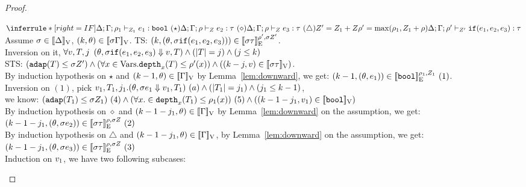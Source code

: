 \documentclass[a4paper,11pt]{article}
\theoremstyle{definition}
\begin{document}
\begin{proof}
\begin{mainitem}
\caseL
{
$
    \inferrule*[right = IF]{
      \Delta; \Gamma; \dmap_1 \tvdash{\nnatA_1} \expr_1: \tbool ~ (\star) \\
      \Delta; \Gamma; \dmap \tvdash{\nnatA} \expr_2: \type ~(\diamond) \\
      \Delta; \Gamma; \dmap \tvdash{\nnatA} \expr_3: \type ~(\triangle) \\\\
      \nnatA' = \nnatA_1 + \nnatA \\
      \dmap' = \max(\dmap_1, \nnatA_1 + \dmap)
    }{
      \Delta; \Gamma; \dmap' \tvdash{\nnatA'} \eif(\expr_1, \expr_2, \expr_3):  \type
    }
$
}
Assume $ \sigma \in [\![ \Delta ]\!]_{\text{V}}$, $(k, \theta) \in [\![ \sigma \Gamma ]\!]_{\text{V}}$. TS: $(k, (\theta, \sigma \mathtt{if}(e_1, e_2, e_3))) \in [\![ \sigma \tau ]\!]_{\text{E}}^{\rho', \sigma Z'}$.\\
%
Inversion on it, $\forall v, T, j$ $(\theta, \sigma  \mathtt{if}(e_1, e_2, e_3) \mathrel{\Downarrow} v, T) \land (|T| = j) \land (j \leq k)$\\
%
STS: $(\mathtt{adap}(T) \leq \sigma  Z') \land (\forall x \in \mbox{Vars}. \mathtt{depth}_{x}(T) \leq \rho'(x)) \land ((k - j, v) \in [\![ \sigma \tau ]\!]_{\text{V}})$.\\
%
By induction hypothesis on $\star$ and $(k-1, \theta) \in
[\![ \Gamma ]\!]_{\text{V}}$ by  Lemma~\ref{lem:downward}, we get: $(k-1, (\theta, e_1)) \in [\![ \mathtt{bool} ]\!]_{\text{E}}^{\rho_1, Z_1} ~(1)$.\\
%
Inversion on $(1)$, pick $ v_1, T_1, j_1. (\theta, \sigma e_1 \mathrel{\Downarrow} v_1, T_1) ~ (a) \land (|T_1| = j_1) \land (j_1 \leq k-1)$,\\
%
we know: $(\mathtt{adap}(T_1) \leq \sigma Z_1)~(4) \land (\forall x. \in
\mathtt{depth}_{x}(T_1) \leq \rho_1(x)) ~(5) \land ((k -1- j_1, v_1) \in [\![ \mathtt{bool} ]\!]_{\text{V}})$\\
%
By induction hypothesis on $\diamond$
%
and $(k-1-j_1, \theta) \in [\![ \Gamma ]\!]_{\text{V}}$
%
by Lemma~\ref{lem:downward} on the assumption, 
%
we get: $(k-1-j_1, (\theta, \sigma e_2)) \in [\![ \sigma \tau ]\!]_{\text{E}}^{\rho, \sigma Z} ~(2)$\\
%
By induction hypothesis on $\triangle$ 
%
and $(k-1-j_1, \theta) \in [\![ \Gamma ]\!]_{\text{V}}$,
%
by Lemma~\ref{lem:downward} on the assumption, 
%
we get: $(k-1-j_1, (\theta, \sigma e_3)) \in [\![ \sigma \tau ]\!]_{\text{E}}^{\rho, \sigma Z} ~(3)$\\
%
Induction on $v_1$, we have two following subcases:


\end{mainitem}
\end{proof}
\end{document}
